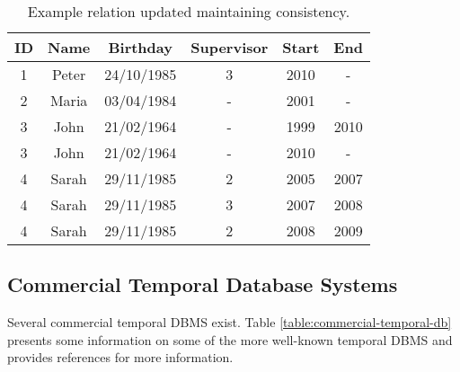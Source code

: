 



\begin{table}
\centering
\caption{Example relation updated maintaining consistency.}
\begin{tabular}{c c c c c c }
\hline
\textbf{ID} & \textbf{Name} & \textbf{Birthday} & \textbf{Supervisor} & \textbf{Start} & \textbf{End} \\ \hline
1 & Peter & 24/10/1985 & 3 &  2010 & - \\
2 & Maria & 03/04/1984 & - & 2001 & - \\
3 & John & 21/02/1964 & - &  1999 & 2010 \\
3 & John & 21/02/1964 & - &  2010 & - \\
4 & Sarah & 29/11/1985 & 2 &  2005 & 2007 \\
4 & Sarah & 29/11/1985 & 3 &  2007 & 2008 \\
4 & Sarah & 29/11/1985 & 2 &  2008 & 2009 \\
\hline 
\end{tabular}
\label{table:example-database-update}



\end{table}





\subsection{\label{Comm-temp}Commercial Temporal Database Systems}
Several commercial temporal DBMS exist. Table \ref{table:commercial-temporal-db} presents some information on some of the more well-known temporal DBMS and provides references for more information. 

